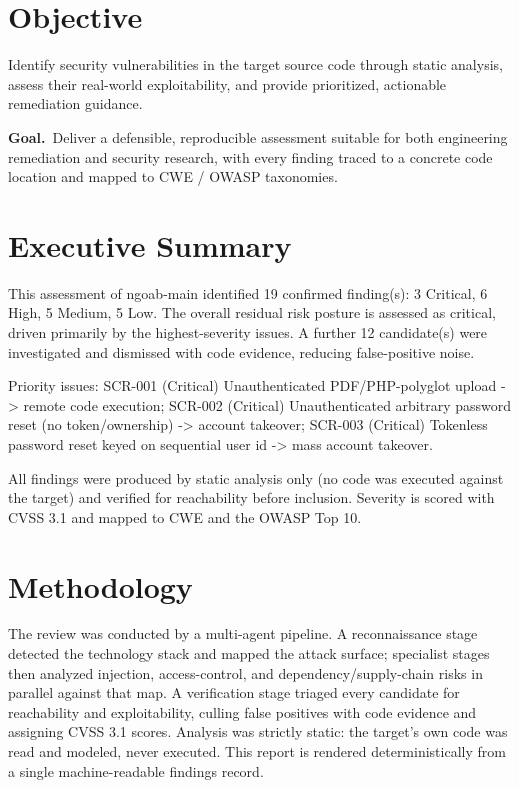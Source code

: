\documentclass[11pt,a4paper]{article}
\begin{document}
\section*{Objective}
Identify security vulnerabilities in the target source code through static analysis, assess their real-world exploitability, and provide prioritized, actionable remediation guidance.\par\vspace{4pt}
\noindent\textbf{Goal.}\ Deliver a defensible, reproducible assessment suitable for both engineering remediation and security research, with every finding traced to a concrete code location and mapped to CWE / OWASP taxonomies.
\section*{Executive Summary}
This assessment of ngoab-main identified 19 confirmed finding(s): 3 Critical, 6 High, 5 Medium, 5 Low. The overall residual risk posture is assessed as critical, driven primarily by the highest-severity issues. A further 12 candidate(s) were investigated and dismissed with code evidence, reducing false-positive noise.\par
Priority issues: SCR-001 (Critical) Unauthenticated PDF/PHP-polyglot upload -\textgreater{} remote code execution; SCR-002 (Critical) Unauthenticated arbitrary password reset (no token/ownership) -\textgreater{} account takeover; SCR-003 (Critical) Tokenless password reset keyed on sequential user id -\textgreater{} mass account takeover.\par
All findings were produced by static analysis only (no code was executed against the target) and verified for reachability before inclusion. Severity is scored with CVSS 3.1 and mapped to CWE and the OWASP Top 10.\par
\section*{Methodology}
The review was conducted by a multi-agent pipeline. A reconnaissance stage detected the technology stack and mapped the attack surface; specialist stages then analyzed injection, access-control, and dependency/supply-chain risks in parallel against that map. A verification stage triaged every candidate for reachability and exploitability, culling false positives with code evidence and assigning CVSS 3.1 scores. Analysis was strictly static: the target's own code was read and modeled, never executed. This report is rendered deterministically from a single machine-readable findings record.
\end{document}

